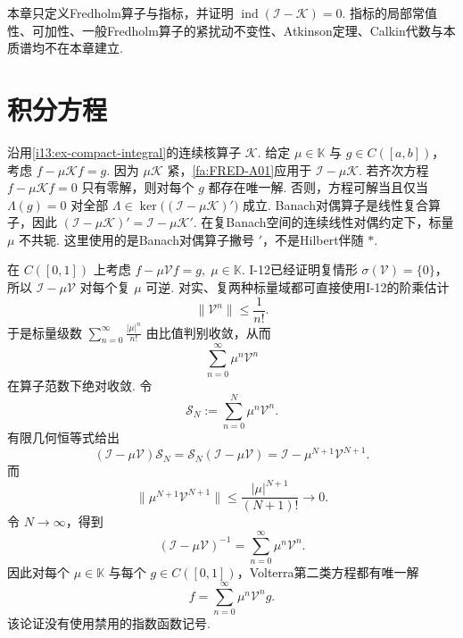 \begin{FARemark}[一般Fredholm指标理论边界]
本章只定义Fredholm算子与指标，并证明 \(\displaystyle \operatorname{ind}(\mathcal I-\mathcal K)=0\). 指标的局部常值性、可加性、一般Fredholm算子的紧扰动不变性、Atkinson定理、Calkin代数与本质谱均不在本章建立.
\end{FARemark}

\section{积分方程}\label{sec:i13-integral-equations}

\begin{FAApplication}[连续核第二类积分方程的Fredholm择一原理]\label{i13:fredholm-integral-application}
沿用\autoref{i13:ex-compact-integral}的连续核算子 \(\displaystyle \mathcal K\). 给定 \(\displaystyle \mu\in\mathbb K\) 与 \(\displaystyle g\in C([a,b])\)，考虑
\(\displaystyle f-\mu\mathcal Kf=g\).
因为 \(\displaystyle \mu\mathcal K\) 紧，\autoref{fa:FRED-A01}应用于 \(\displaystyle \mathcal I-\mu\mathcal K\). 若齐次方程
\(\displaystyle f-\mu\mathcal Kf=0\)
只有零解，则对每个 \(\displaystyle g\) 都存在唯一解. 否则，方程可解当且仅当
\(\displaystyle \Lambda(g)=0\)
对全部
\(\displaystyle \Lambda \in \ker\bigl((\mathcal I-\mu\mathcal K)'\bigr)\)
成立. Banach对偶算子是线性复合算子，因此
\(\displaystyle (\mathcal I-\mu\mathcal K)' = \mathcal I-\mu\mathcal K'\).
在复Banach空间的连续线性对偶约定下，标量 \(\displaystyle \mu\) 不共轭. 这里使用的是Banach对偶算子撇号 \(\displaystyle '\)，不是Hilbert伴随 \(\displaystyle *\).
\end{FAApplication}

\begin{FAApplication}[Volterra第二类方程全参数唯一可解]\label{i13:volterra-second-kind}
在 \(\displaystyle C([0,1])\) 上考虑
\(\displaystyle f-\mu\mathcal Vf=g, \; \mu\in\mathbb K\).
I-12已经证明复情形 \(\displaystyle \sigma(\mathcal V)=\{0\}\)，所以 \(\displaystyle \mathcal I-\mu\mathcal V\) 对每个复 \(\displaystyle \mu\) 可逆. 对实、复两种标量域都可直接使用I-12的阶乘估计
\[
\|\mathcal V^n\|
\leqslant
\frac{1}{n!}.
\]
于是标量级数 \(\displaystyle \sum_{n=0}^{\infty}\frac{|\mu|^n}{n!}\) 由比值判别收敛，从而
\[
\sum_{n=0}^{\infty}\mu^n\mathcal V^n
\]
在算子范数下绝对收敛. 令
\[
\mathcal S_N
:=
\sum_{n=0}^{N}\mu^n\mathcal V^n.
\]
有限几何恒等式给出
\[
(\mathcal I-\mu\mathcal V)\mathcal S_N
=
\mathcal S_N(\mathcal I-\mu\mathcal V)
=
\mathcal I-\mu^{N+1}\mathcal V^{N+1}.
\]
而
\[
\|\mu^{N+1}\mathcal V^{N+1}\|
\leqslant
\frac{|\mu|^{N+1}}{(N+1)!}
\to0.
\]
令 \(\displaystyle N\to\infty\)，得到
\[
(\mathcal I-\mu\mathcal V)^{-1}
=
\sum_{n=0}^{\infty}\mu^n\mathcal V^n.
\]
因此对每个 \(\displaystyle \mu\in\mathbb K\) 与每个 \(\displaystyle g\in C([0,1])\)，Volterra第二类方程都有唯一解
\[
f
=
\sum_{n=0}^{\infty}\mu^n\mathcal V^ng.
\]
该论证没有使用禁用的指数函数记号.
\end{FAApplication}

